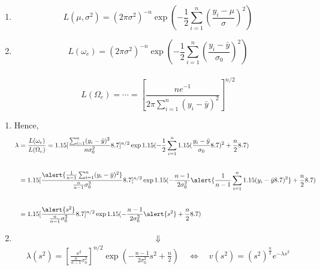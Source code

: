 \begin{frame}
	\begin{enumerate}
		\item[]
			\[
				L(\mu,\sigma^2) = (2\pi \sigma^2)^{-n} \exp \left( -\frac{1}{2} \sum_{i=1}^n \left(  \frac{y_i-\mu}{\sigma} \right)^2\right)
			\]
			\vfill
		\item[]	\[
				L(\omega_e) =  (2\pi \sigma^2)^{-n} \exp \left( -\frac{1}{2} \sum_{i=1}^n \left(  \frac{y_i-\bar{y}}{\sigma_0} \right)^2\right)
			\]
			\\[1em]
			\[
				L(\Omega_e) =  \cdots  = \left[  \frac{ne^{-1}}{2\pi\sum_{i=1}^n (y_i-\bar{y})^2}\right]^{n/2}
			\]
		\end{enumerate}
\end{frame}
\begin{frame}
\begin{enumerate}
		\item[] Hence,
		\begin{align*}
			\lambda & = \frac{L(\omega_e)}{L(\Omega_e)} = \left[  \frac{\sum_{i=1}^n (y_i-\bar{y})^2}{n\sigma_0^2}\right]^{n/2} \exp\left(- \frac{1}{2}\sum_{i=1}^n \left( \frac{y_i-\bar{y}}{\sigma_0} \right)^2 +\frac n2\right)                 \\[2em]
							& = \left[  \frac{\alert{\frac{1}{n-1}\sum_{i=1}^n (y_i-\bar{y})^2}}{ \frac{n}{n-1}\sigma_0^2}\right]^{n/2} \exp\left(- \frac{n-1}{2\sigma_0^2} \alert{\frac{1}{n-1}\sum_{i=1}^n \left( y_i-\bar{y}\right)^2} +\frac n2\right) \\[2em]
							& = \left[  \frac{ \alert{s^2}}{ \frac{n}{n-1}\sigma_0^2}\right]^{n/2} \exp\left(- \frac{n-1}{2\sigma_0^2} \alert{s^2} +\frac n2\right)
		\end{align*}
		\item[] \[\Downarrow\]
		\begin{align*}
			\lambda(s^2) = \left[  \frac{ s^2}{ \frac{n}{n-1}\sigma_0^2}\right]^{n/2} \exp\left(- \frac{n-1}{2\sigma_0^2} s^2 +\frac n2\right)
			\quad\Longleftrightarrow\quad v(s^2) = (s^2)^{\frac{n}{2}} e^{ -\lambda s^2 }
		\end{align*}
\end{enumerate}
\end{frame}
